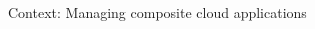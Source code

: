 \documentclass{beamer}
\begin{document}
\begin{frame}[t]{Context: Managing composite cloud applications}
\begin{columns}[b]
\begin{column}{.3\textwidth}
      \end{column}
      \begin{column}{.3\textwidth}
        \centering
      \end{column}
    \end{columns}
  \end{frame}
\end{document}
